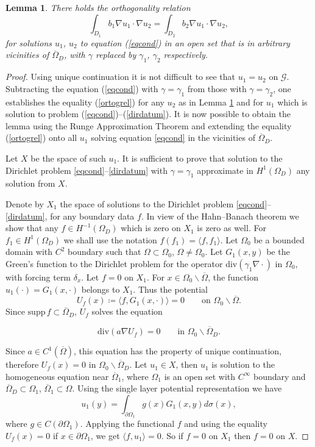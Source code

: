 \documentclass[10pt, a4paper, twoside, openright]{book}
\theoremstyle{definition}
\theoremstyle{plain}
\theoremstyle{plain}
\theoremstyle{plain}
\theoremstyle{plain}
\theoremstyle{plain}
\newtheorem{lemma}[subsection]{Lemma}
\theoremstyle{plain}
\theoremstyle{plain}
\theoremstyle{plain}
\begin{document}
\begin{lemma}
There holds the orthogonality relation
\label{ortog}
\begin{equation}
\label{ortogrel}
\int_{D_1}b_1\nabla u_1\cdot\nabla u_2=\int_{D_2}b_2\nabla u_1\cdot\nabla u_2,
\end{equation}
for solutions $u_1$, $u_2$ to equation (\ref{eqcond})
in an open set that is in arbitrary
vicinities of $\overline{\Omega}_D$,
with $\gamma$ replaced by $\gamma_1$, $\gamma_2$ respectively.
\end{lemma}
\begin{proof}
Using unique continuation it is not difficult to see that
$u_{1}=u_2$ on $\mathcal{G}$.
Subtracting the equation (\ref{eqcond}) with $\gamma=\gamma_1$
from those with $\gamma=\gamma_2$, one establishes the equality
(\ref{ortogrel}) for any $u_2$ as in Lemma \ref{ortog} and for $u_1$ which
is solution to problem (\ref{eqcond})--(\ref{dirdatum}).
It is now possible to obtain the lemma using the Runge Approximation
Theorem and extending the equality (\ref{ortogrel})
onto all $u_1$ solving equation \eqref{eqcond} in the vicinities of $\overline{\Omega}_D$.

Let $X$ be the space of such $u_1$. It is sufficient to prove that solution to
the Dirichlet problem \eqref{eqcond}--\eqref{dirdatum}
with $\gamma=\gamma_1$ approximate in $H^1(\Omega_D)$ any
solution from $X$.

Denote by $X_1$ the space of solutions to the Dirichlet problem
\eqref{eqcond}--\eqref{dirdatum}, for any boundary data $f$. In view of the
Hahn--Banach theorem we show that any $f\in H^{-1}(\Omega_D)$ which
is zero on $X_1$ is zero as well.
For $f_1\in H^{1}(\Omega_D)$ we shall use the notation
$f(f_1)=\langle f,f_1\rangle$.
Let $\Omega_0$ be a bounded domain with $C^2$ boundary
such that $\Omega\subset\Omega_0$, $\Omega\neq\Omega_0$.
Let $G_1(x,y)$ be the Green's function to the Dirichlet problem for the
operator $\mathrm{div}(\gamma_1\nabla\cdot)$ in $\Omega_0$, with forcing term 
$\delta_x$.
Let $f=0$ on $X_1$.
For $x\in\Omega_0\backslash\overline{\Omega}$,
the function
$u_1(\cdot)=G_1(x,\cdot)$ belongs to $X_1$.
Thus the potential
$$U_f(x)\coloneqq\langle f,G_1(x,\cdot)\rangle=0\qquad
\textrm{on }\Omega_0\backslash\overline{\Omega}.$$
Since $\mathrm{supp}\,f\subset\overline{\Omega}_D$, $U_f$ solves
the equation

$$\mathrm{div}(a\nabla U_f)=0\qquad
\textrm{in }\Omega_0\backslash\overline{\Omega}_D.$$

Since $a\in C^1(\overline{\Omega})$, this equation has the property
of unique continuation, therefore $U_f(x)=0$ in $\Omega_0\backslash\overline{\Omega}_D$.
Let $u_1\in X$, then $u_1$ is solution to the homogeneous
equation near $\overline{\Omega}_1$, where
$\Omega_1$ is an open set with $C^{\infty}$ boundary
and $\overline{\Omega}_D\subset\Omega_1$, $\overline{\Omega}_1\subset\Omega$.
Using the single layer potential representation we have
$$u_1(y)=\int_{\partial\Omega_1}g(x)G_1(x,y)d\sigma(x),$$
where $g\in C(\partial\Omega_1)$.
Applying the functional $f$ and using the equality $U_f(x)=0$
if $x\in\partial \Omega_1$, we get $\langle f,u_1\rangle=0$.
So if $f=0$ on $X_1$ then $f=0$ on $X$.
\end{proof}
\end{document}
